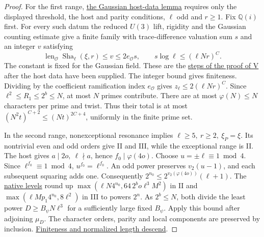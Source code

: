 \documentclass[letterpaper,11pt]{article}
\newcommand{\QQ}{\mathbb Q}
\newcommand{\Sha}{\operatorname{Sha}}
\newcommand{\len}{\operatorname{len}}
\newcommand{\leanrange}[4]{\href{https://github.com/leanprover-community/riemann-hypothesis/blob/40e56bab026552e089d7afcfeff08d2defb9c005/#1\#L#2-L#3}{#4}}
\begin{document}
\begin{proof}
For the first range, \leanrange{src/Development/AutomorphicArithmetic/AutomorphicVarieties/UnitaryThreeDeformations/HostDataOf.lean}{9}{20}{the Gaussian host-data lemma} requires only the displayed threshold, the host and parity conditions, \(\ell\) odd and \(r\ge1\). Fix \(\QQ(i)\) first. For every such datum the reduced \(U(3)\) lift, rigidity and the Gaussian counting estimate give a finite family with trace-difference valuation sum \(s\) and an integer \(v\) satisfying
\[
 \len_{\mathcal O}\Sha_\ell(\xi,r)\le v\le 2e_{\mathcal O}s,\qquad
 s\log\ell\le(\ell Nr)^C .
\]
The constant is fixed for the Gaussian field. These are the \leanrange{src/Development/AutomorphicArithmetic/AutomorphicVarieties/ModularityArgument/ThresholdArguments/DenseThresholdCases/CountVOf.lean}{35}{60}{steps of the proof of V} after the host data have been supplied. The integer bound gives finiteness. Dividing by the coefficient ramification index \(e_{\mathcal O}\) gives \(z_\ell\le2(\ell Nr)^C\). Since \(\ell^2\le R_1\le2^b\le N\), at most \(N\) primes contribute. There are at most \(\varphi(N)\le N\) characters per prime and twist. Thus their total is at most \((N^2t)^{C+2}\le(Nt)^{2C+4}\), uniformly in the finite prime set.

In the second range, nonexceptional resonance implies \(\ell\ge5,\ r\ge2,\ \xi_P=\xi\). Its nontrivial even and odd orders give II and III, while the exceptional range is II. The host gives \(a\mid2o,\ \ell\nmid a\), hence \(f_0\mid\varphi(4o)\). Choose \(u=\pm\ell\equiv1\bmod4\). Since \(\ell^{f_0}\equiv1\bmod4\), \(u^{f_0}=\ell^{f_0}\). An odd power preserves \(v_2(u-1)\), and each subsequent squaring adds one. Consequently \(2^{n_0}\le2^{v_2(\varphi(4o))}(\ell+1)\). The \leanrange{src/Development/AutomorphicArithmetic/AutomorphicVarieties/HeightAndVanishing/DirichletPrimeToLPartMulLPowerPart.lean}{221}{225}{native levels} round up \(\max(\ell N4^{n_0},64\,2^b o\ell^3 M^2)\) in II and \(\max(\ell M p_1 4^{n_0},8\ell^2)\) in III to powers \(2^n\). As \(2^b\le N\), both divide the least power \(D\ge B_\psi N\ell^3\) for a sufficiently large fixed \(B_\psi\). Apply this bound after adjoining \(\mu_D\). The character orders, parity and local components are preserved by inclusion. \leanrange{src/Development/AutomorphicArithmetic/AutomorphicVarieties/HeightAndVanishing/CoefIndep.lean}{68}{77}{Finiteness and normalized length descend}.


\end{proof}
\end{document}
